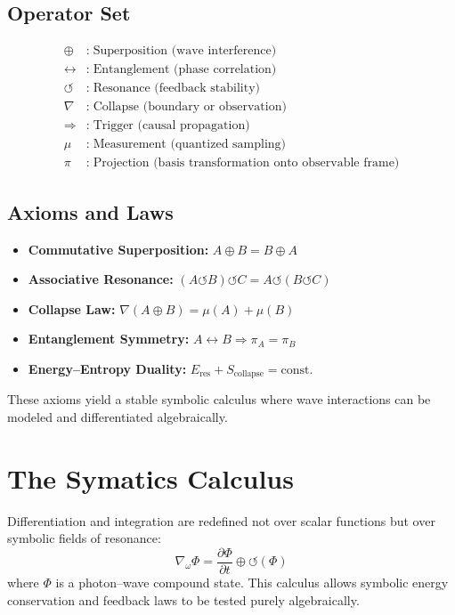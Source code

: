 \documentclass[12pt]{article}
\begin{document}
\subsection{Operator Set}
\begin{align*}
    \oplus &:\; \text{Superposition (wave interference)}\\
    \leftrightarrow &:\; \text{Entanglement (phase correlation)}\\
    \circlearrowleft &:\; \text{Resonance (feedback stability)}\\
    \nabla &:\; \text{Collapse (boundary or observation)}\\
    \Rightarrow &:\; \text{Trigger (causal propagation)}\\
    \mu &:\; \text{Measurement (quantized sampling)}\\
    \pi &:\; \text{Projection (basis transformation onto observable frame)}
\end{align*}

\subsection{Axioms and Laws}
\begin{itemize}[noitemsep]
    \item \textbf{Commutative Superposition:} $A \oplus B = B \oplus A$
    \item \textbf{Associative Resonance:} $(A \circlearrowleft B)\circlearrowleft C = A\circlearrowleft(B\circlearrowleft C)$
    \item \textbf{Collapse Law:} $\nabla(A \oplus B) = \mu(A)+\mu(B)$
    \item \textbf{Entanglement Symmetry:} $A \leftrightarrow B \Rightarrow \pi_A = \pi_B$
    \item \textbf{Energy–Entropy Duality:} $E_{\text{res}} + S_{\text{collapse}} = \mathrm{const.}$
\end{itemize}

These axioms yield a stable symbolic calculus where wave interactions can be modeled and differentiated algebraically.

\section{The Symatics Calculus}

Differentiation and integration are redefined not over scalar functions but over symbolic fields of resonance:
\[
\nabla_{\omega}\Phi = \frac{\partial \Phi}{\partial t} \oplus \circlearrowleft(\Phi)
\]
where $\Phi$ is a photon–wave compound state.  
This calculus allows symbolic energy conservation and feedback laws to be tested purely algebraically.
\end{document}
